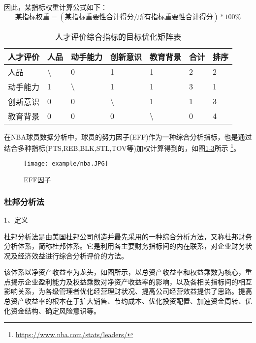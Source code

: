 因此，某指标权重计算公式如下：
\begin{equation}
\mbox{某指标权重}=(\mbox{某指标重要性合计得分}/\mbox{所有指标重要性合计得分}) * 100 \%
\end{equation}

\begin{table}[]
\centering
\caption{人才评价综合指标的目标优化矩阵表}
\begin{tabular}{|l|l|l|l|l|l|l|}
\hline
人才评价 & 人品               & 动手能力                     & 创新意识             & 教育背景             & 合计 & 排序 \\ \hline
人品   & \textbackslash{} & {\color[HTML]{333333} 0} & 1                & 1                & 2  & 2  \\ \hline
动手能力 & 1                & \textbackslash{}         & 1                & 1                & 3  & 1  \\ \hline
创新意识 & 0                & 0                        & \textbackslash{} & 1                & 1  & 3  \\ \hline
教育背景 & 0                & 0                        & 0                & \textbackslash{} & 0  & 4  \\ \hline
\end{tabular}
\end{table}

在NBA球员数据分析中，球员的努力因子(EFF)作为一种综合分析指标，也是通过结合多种指标(PTS,REB,BLK,STL,TOV等)加权计算得到的，如图\href{figure:1-7}{1-3}所示 \footnote{\url{https://www.nba.com/stats/leaders/}}。

\begin{figure}[!htp]

\centering
\texttt{[image: example/nba.JPG]}
\caption{EFF因子}
\label{figure:1-7}

\end{figure}

\subsubsection{杜邦分析法}

1、定义

杜邦分析法是由美国杜邦公司创造并最先采用的一种综合分析方法，又称杜邦财务分析体系，简称杜邦体系。它是利用各主要财务指标间的内在联系，对企业财务状况及经济效益进行综合分析评价的方法。

该体系以净资产收益率为龙头，如图\href{}{}所示，以总资产收益率和权益乘数为核心，重点揭示企业盈利能力及权益乘数对净资产收益率的影响，以及各相关指标间的相互影响关系，为各级管理者优化经营理财状况、提高公司经营效益提供了思路。提高总资产收益率的根本在于扩大销售、节约成本、优化投资配置、加速资金周转、优化资金结构、确定风险意识等。

